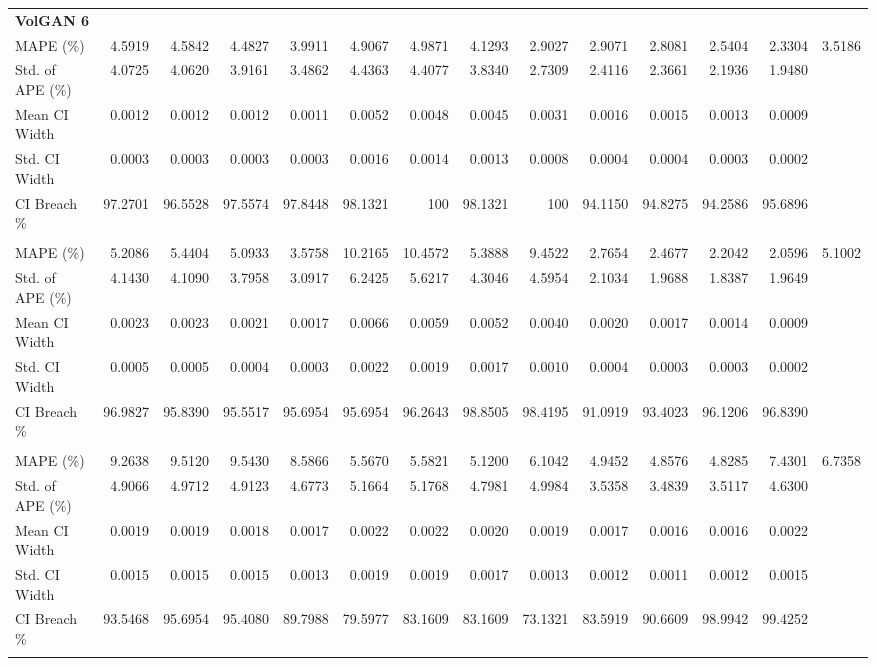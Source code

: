 \documentclass{article}
\begin{document}
\begin{table}[h!]
{\begin{tabular}{l rrrrrrrrrrrrr}
\multicolumn{14}{l}{\textbf{VolGAN 6}} \\
MAPE (\%) & 4.5919 & 4.5842 & 4.4827 & 3.9911 & 4.9067 & 4.9871 & 4.1293 & 2.9027 & 2.9071 & 2.8081 & 2.5404 & 2.3304 & 3.5186 \\
Std. of APE (\%) & 4.0725 & 4.0620 & 3.9161 & 3.4862 & 4.4363 & 4.4077 & 3.8340 & 2.7309 & 2.4116 & 2.3661 & 2.1936 & 1.9480 &  \\
Mean CI Width & 0.0012 & 0.0012 & 0.0012 & 0.0011 & 0.0052 & 0.0048 & 0.0045 & 0.0031 & 0.0016 & 0.0015 & 0.0013 & 0.0009 &  \\
Std. CI Width & 0.0003 & 0.0003 & 0.0003 & 0.0003 & 0.0016 & 0.0014 & 0.0013 & 0.0008 & 0.0004 & 0.0004 & 0.0003 & 0.0002 &  \\
CI Breach \% & 97.2701 & 96.5528 & 97.5574 & 97.8448 & 98.1321 & 100 & 98.1321 & 100 & 94.1150 & 94.8275 & 94.2586 & 95.6896 &  \\
\addlinespace

\multicolumn{14}{l}{\textbf{VolGAN 7}} \\
MAPE (\%) & 5.2086 & 5.4404 & 5.0933 & 3.5758 & 10.2165 & 10.4572 & 5.3888 & 9.4522 & 2.7654 & 2.4677 & 2.2042 & 2.0596 & 5.1002 \\
Std. of APE (\%) & 4.1430 & 4.1090 & 3.7958 & 3.0917 & 6.2425 & 5.6217 & 4.3046 & 4.5954 & 2.1034 & 1.9688 & 1.8387 & 1.9649 &  \\
Mean CI Width & 0.0023 & 0.0023 & 0.0021 & 0.0017 & 0.0066 & 0.0059 & 0.0052 & 0.0040 & 0.0020 & 0.0017 & 0.0014 & 0.0009 &  \\
Std. CI Width & 0.0005 & 0.0005 & 0.0004 & 0.0003 & 0.0022 & 0.0019 & 0.0017 & 0.0010 & 0.0004 & 0.0003 & 0.0003 & 0.0002 &  \\
CI Breach \% & 96.9827 & 95.8390 & 95.5517 & 95.6954 & 95.6954 & 96.2643 & 98.8505 & 98.4195 & 91.0919 & 93.4023 & 96.1206 & 96.8390 &  \\
\addlinespace

\multicolumn{14}{l}{\textbf{VolGAN 8}} \\
MAPE (\%) & 9.2638 & 9.5120 & 9.5430 & 8.5866 & 5.5670 & 5.5821 & 5.1200 & 6.1042 & 4.9452 & 4.8576 & 4.8285 & 7.4301 & 6.7358 \\
Std. of APE (\%) & 4.9066 & 4.9712 & 4.9123 & 4.6773 & 5.1664 & 5.1768 & 4.7981 & 4.9984 & 3.5358 & 3.4839 & 3.5117 & 4.6300 &  \\
Mean CI Width & 0.0019 & 0.0019 & 0.0018 & 0.0017 & 0.0022 & 0.0022 & 0.0020 & 0.0019 & 0.0017 & 0.0016 & 0.0016 & 0.0022 &  \\
Std. CI Width & 0.0015 & 0.0015 & 0.0015 & 0.0013 & 0.0019 & 0.0019 & 0.0017 & 0.0013 & 0.0012 & 0.0011 & 0.0012 & 0.0015 &  \\
CI Breach \% & 93.5468 & 95.6954 & 95.4080 & 89.7988 & 79.5977 & 83.1609 & 83.1609 & 73.1321 & 83.5919 & 90.6609 & 98.9942 & 99.4252 &  \\
\addlinespace


\end{tabular}}
\end{table}
\end{document}
